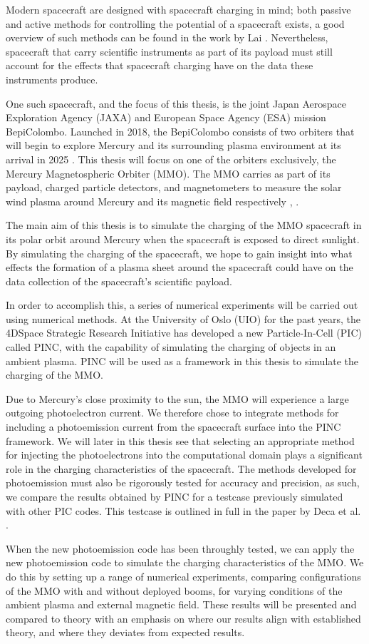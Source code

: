 Modern spacecraft are designed with spacecraft charging in mind; both passive and active methods for controlling the potential of a spacecraft exists, a good overview of such methods can be found in the work by Lai \parencite{Lai2003}. Nevertheless, spacecraft that carry scientific instruments as part of its payload must still account for the effects that spacecraft charging have on the data these instruments produce. 

One such spacecraft, and the focus of this thesis, is the joint Japan Aerospace Exploration Agency (JAXA) and European Space Agency (ESA) mission BepiColombo. Launched in 2018, the BepiColombo consists of two orbiters that will begin to explore Mercury and its surrounding plasma environment at its arrival in 2025 \parencite{Benkhoff2009}. This thesis will focus on one of the orbiters exclusively, the Mercury Magnetospheric Orbiter (MMO). The MMO carries as part of its payload, charged particle detectors, and magnetometers to measure the solar wind plasma around Mercury and its magnetic field respectively \parencite{Saito2010}, \parencite{Benkhoff2009}. 

The main aim of this thesis is to simulate the charging of the MMO spacecraft in its polar orbit around Mercury when the spacecraft is exposed to direct sunlight. By simulating the charging of the spacecraft, we hope to gain insight into what effects the formation of a plasma sheet around the spacecraft could have on the data collection of the spacecraft's scientific payload.

In order to accomplish this, a series of numerical experiments will be carried out using numerical methods. At the University of Oslo (UIO) for the past years, the 4DSpace Strategic Research Initiative has developed a new Particle-In-Cell (PIC) called PINC, with the capability of simulating the charging of objects in an ambient plasma. PINC will be used as a framework in this thesis to simulate the charging of the MMO.

Due to Mercury's close proximity to the sun, the MMO will experience a large outgoing photoelectron current. We therefore chose to integrate methods for including a photoemission current from the spacecraft surface into the PINC framework. We will later in this thesis see that selecting an appropriate method for injecting the photoelectrons into the computational domain plays a significant role in the charging characteristics of the spacecraft. The methods developed for photoemission must also be rigorously tested for accuracy and precision, as such, we compare the results obtained by PINC for a testcase previously simulated with other PIC codes. This testcase is outlined in full in the paper by Deca et al. \parencite{Deca2013}.

When the new photoemission code has been throughly tested, we can apply the new photoemission code to simulate the charging characteristics of the MMO. We do this by setting up a range of numerical experiments, comparing configurations of the MMO with and without deployed booms, for varying conditions of the ambient plasma and external magnetic field. These results will be presented and compared to theory with an emphasis on where our results align with established theory, and where they deviates from expected results. 
\newpage